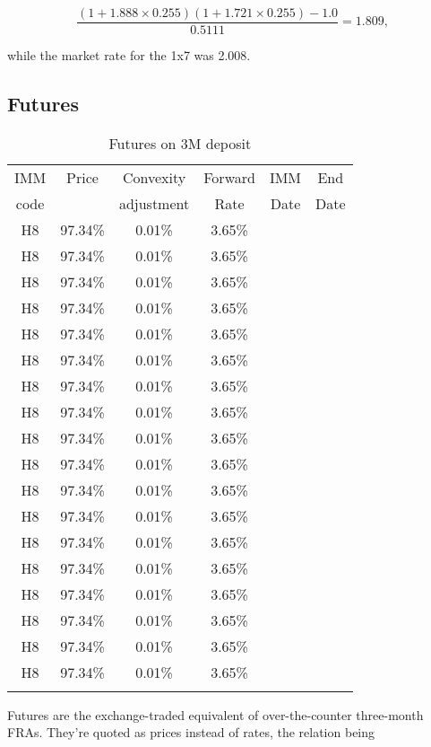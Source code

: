 \documentclass[11pt,reqno]{amsart}
\begin{document}
\begin{equation}
\frac{
    \left( 1 + 1.888 \times 0.255\right)
    \left( 1 + 1.721 \times 0.255\right)
    - 1.0
}{
    0.5111
}=1.809,
\label{eqn:FRAarbitrage}
\end{equation}

while the market rate for the 1x7 was 2.008.

\subsection{Futures}

\begin{table}[tbp]
\label{tab:futures}
\begin{tabular}{cccccc}
IMM  & Price & Convexity  & Forward & IMM  & End  \\
code &       & adjustment & Rate    & Date & Date \\
H8 & 97.34\% & 0.01\% & 3.65\% &  &  \\
H8 & 97.34\% & 0.01\% & 3.65\% &  &  \\
H8 & 97.34\% & 0.01\% & 3.65\% &  &  \\
H8 & 97.34\% & 0.01\% & 3.65\% &  &  \\
H8 & 97.34\% & 0.01\% & 3.65\% &  &  \\
H8 & 97.34\% & 0.01\% & 3.65\% &  &  \\
H8 & 97.34\% & 0.01\% & 3.65\% &  &  \\
H8 & 97.34\% & 0.01\% & 3.65\% &  &  \\
H8 & 97.34\% & 0.01\% & 3.65\% &  &  \\
H8 & 97.34\% & 0.01\% & 3.65\% &  &  \\
H8 & 97.34\% & 0.01\% & 3.65\% &  &  \\
H8 & 97.34\% & 0.01\% & 3.65\% &  &  \\
H8 & 97.34\% & 0.01\% & 3.65\% &  &  \\
H8 & 97.34\% & 0.01\% & 3.65\% &  &  \\
H8 & 97.34\% & 0.01\% & 3.65\% &  &  \\
H8 & 97.34\% & 0.01\% & 3.65\% &  &  \\
H8 & 97.34\% & 0.01\% & 3.65\% &  &  \\
H8 & 97.34\% & 0.01\% & 3.65\% &  &  \\
&  &  &  &  &
\end{tabular}%
\caption{Futures on 3M deposit}
\end{table}

Futures are the exchange-traded equivalent of over-the-counter
three-month FRAs.  They're quoted as prices instead of rates, the relation being
\end{document}
